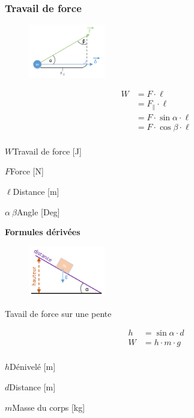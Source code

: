 \documentclass[12pt,a4paper]{article} %
\begin{document}
\subsubsection*{Travail de force}
\begin{figure}[h]
	\centering
	\includegraphics[width=0.3\textwidth]{Mecanique-Generalite}
\end{figure}
\begin{twocols}[0.5][0.5]
	\begin{align*}
		W &= F \cdot \ell \\
		  &= F_\parallel \cdot \ell \\
		  &= F \cdot \sin \alpha \cdot \ell \\
		  &= F \cdot \cos \beta \cdot \ell \\
	\end{align*}
\nextcol
	\begin{vardef}
		\item{$W$}{Travail de force [J]}
		\item{$F$}{Force [N]}
		\item{$\ell$}{Distance [m]}
		\item{$\alpha \: \beta$}{Angle [Deg]}
	\end{vardef}
\end{twocols}

\textbf{Formules dérivées}

\begin{figure}[h]
	\centering
	\includegraphics[width=0.3\textwidth]{Mecanique-Travail}
\end{figure}
Tavail de force sur une pente \\
\begin{twocols}[0.5][0.5]
	\begin{align*}
		h &= \sin \alpha \cdot d \\
		W &= h \cdot m \cdot g \\
	\end{align*}
\nextcol
	\begin{vardef}
		\item{$h$}{Dénivelé [m]}
		\item{$d$}{Distance [m]}
		\item{$m$}{Masse du corps [kg]}
	\end{vardef}
\end{twocols}
\end{document}
